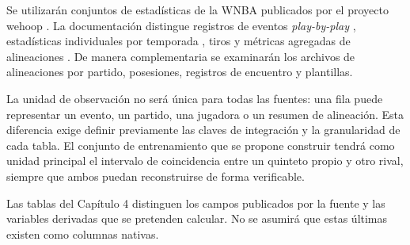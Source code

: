 Se utilizarán conjuntos de estadísticas de la WNBA publicados por el proyecto wehoop \cite{wehoopRepositorio}. La documentación distingue registros de eventos \textit{play-by-play} \cite{wehoopPbp}, estadísticas individuales por temporada \cite{wehoopPlayerSeason}, tiros \cite{wehoopShots} y métricas agregadas de alineaciones \cite{wehoopLineups}. De manera complementaria se examinarán los archivos de alineaciones por partido, posesiones, registros de encuentro y plantillas.

La unidad de observación no será única para todas las fuentes: una fila puede representar un evento, un partido, una jugadora o un resumen de alineación. Esta diferencia exige definir previamente las claves de integración y la granularidad de cada tabla. El conjunto de entrenamiento que se propone construir tendrá como unidad principal el intervalo de coincidencia entre un quinteto propio y otro rival, siempre que ambos puedan reconstruirse de forma verificable.

Las tablas del Capítulo 4 distinguen los campos publicados por la fuente y las variables derivadas que se pretenden calcular. No se asumirá que estas últimas existen como columnas nativas.